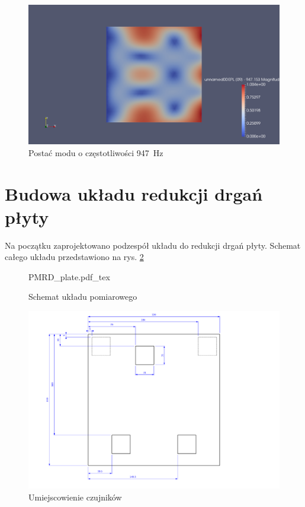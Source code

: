 \documentclass[polish,a4paper,11pt]{mwart}
\let\Oldsection\section
\renewcommand{\section}{\FloatBarrier\Oldsection}
\begin{document}
\begin{figure}[!tbh]
  \centering
  \includegraphics[width=\textwidth]{./plate_vib/947Hz.png}
  \caption{Postać modu o częstotliwości \SI{947}{\hertz}}
  \label{fig:mod5}
\end{figure}

\section{Budowa układu redukcji drgań płyty}

Na początku zaprojektowano podzespół układu do redukcji drgań płyty. Schemat
całego układu przedstawiono na rys. \ref{fig:schemat}

\begin{figure}[!tbh]
  \centering
  {PMRD_plate.pdf_tex}
  \caption{Schemat układu pomiarowego}
  \label{fig:schemat}
\end{figure}

\begin{figure}[!tbh]
  \centering
  \includegraphics[width=\textwidth]{./vecgraphics/plate_dim.pdf}
  \caption{Umiejscowienie czujników}
  \label{fig:wymiary}
\end{figure}
\end{document}
